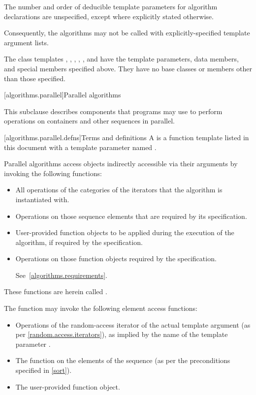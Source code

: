 \pnum
The number and order of deducible template parameters for algorithm declarations
are unspecified, except where explicitly stated otherwise.
\begin{note}
Consequently, the algorithms may not
be called with explicitly-specified template argument lists.
\end{note}

\pnum
The class templates
,
,
,
,
, and
have the template parameters, data members, and special members specified above.
They have no base classes or members other than those specified.

[algorithms.parallel]{Parallel algorithms}

\pnum
This subclause describes components that \Cpp{} programs may use
to perform operations on containers and other sequences in parallel.

[algorithms.parallel.defns]{Terms and definitions}
\pnum
A  is a function template listed in this document
with a template parameter named .

\pnum
Parallel algorithms access objects indirectly accessible via their arguments
by invoking the following functions:
\begin{itemize}
\item
  All operations of the categories of the iterators
  that the algorithm is instantiated with.
\item
  Operations on those sequence elements that are required by its specification.
\item
  User-provided function objects
  to be applied during the execution of the algorithm,
  if required by the specification.
\item
  Operations on those function objects required by the specification.
\begin{note}
See~\ref{algorithms.requirements}.
\end{note}
\end{itemize}
These functions are herein called .
\begin{example}
The  function may invoke the following element access functions:
\begin{itemize}
\item
  Operations of the random-access iterator of the actual template argument
  (as per \ref{random.access.iterators}),
  as implied by the name of the template parameter .
\item
  The  function on the elements of the sequence
  (as per the preconditions specified in \ref{sort}).
\item
  The user-provided  function object.
\end{itemize}
\end{example}

